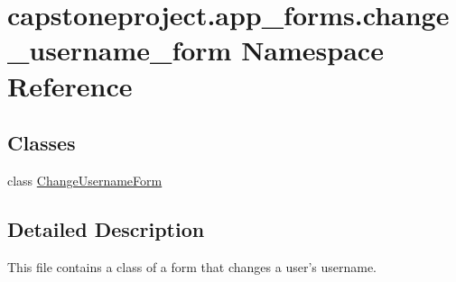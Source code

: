 \hypertarget{namespacecapstoneproject_1_1app__forms_1_1change__username__form}{}\section{capstoneproject.\+app\+\_\+forms.\+change\+\_\+username\+\_\+form Namespace Reference}
\label{namespacecapstoneproject_1_1app__forms_1_1change__username__form}
\subsection*{Classes}
\begin{DoxyCompactItemize}
\item 
class \mbox{\hyperlink{classcapstoneproject_1_1app__forms_1_1change__username__form_1_1_change_username_form}{Change\+Username\+Form}}
\end{DoxyCompactItemize}


\subsection{Detailed Description}
\begin{DoxyVerb}This file contains a class of a form that changes a user's username.
\end{DoxyVerb}
 